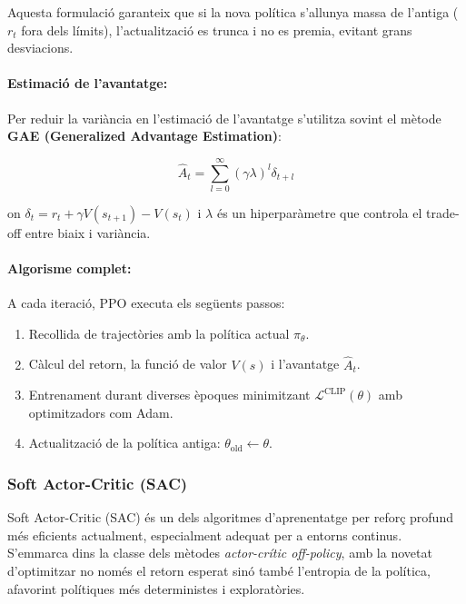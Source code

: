 \documentclass[12pt,a4paper,twoside]{book}
\begin{document}
Aquesta formulació garanteix que si la nova política s'allunya massa de l'antiga ($r_t$ fora dels límits), l'actualització es trunca i no es premia, evitant grans desviacions.

\paragraph{Estimació de l'avantatge:}

Per reduir la variància en l'estimació de l'avantatge s'utilitza sovint el mètode \textbf{GAE (Generalized Advantage Estimation)}:

\begin{equation}
\hat{A}_t = \sum_{l=0}^{\infty} (\gamma \lambda)^l \delta_{t+l}
\end{equation}

on $\delta_t = r_t + \gamma V(s_{t+1}) - V(s_t)$ i $\lambda$ és un hiperparàmetre que controla el trade-off entre biaix i variància.

\paragraph{Algorisme complet:}

A cada iteració, PPO executa els següents passos:
\begin{enumerate}
  \item Recollida de trajectòries amb la política actual $\pi_\theta$.
  \item Càlcul del retorn, la funció de valor $V(s)$ i l'avantatge $\hat{A}_t$.
  \item Entrenament durant diverses èpoques minimitzant $\mathcal{L}^{\text{CLIP}}(\theta)$ amb optimitzadors com Adam.
  \item Actualització de la política antiga: $\theta_{\text{old}} \leftarrow \theta$.
\end{enumerate}


\subsubsection{Soft Actor-Critic (SAC)}

Soft Actor-Critic (SAC) és un dels algoritmes d'aprenentatge per reforç profund més eficients actualment, especialment adequat per a entorns continus. S'emmarca dins la classe dels mètodes \textit{actor-crític off-policy}, amb la novetat d'optimitzar no només el retorn esperat sinó també l'entropia de la política, afavorint polítiques més deterministes i exploratòries.
\end{document}
